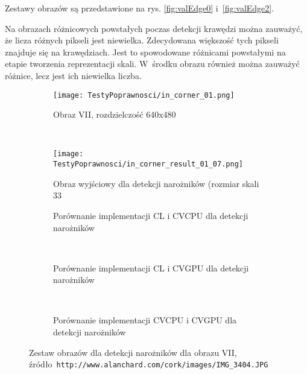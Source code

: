 Zestawy obrazów są przedstawione na rys. \ref{fig:valEdge0} i~\ref{fig:valEdge2}. 

Na obrazach różnicowych powstałych poczas detekcji krawędzi można zauważyć, że licza różnych pikseli jest niewielka. Zdecydowana większość tych pikseli znajduje się na krawędziach. Jest to spowodowane różnicami powstałymi na etapie tworzenia reprezentacji skali. W~środku obrazu również można zauważyć różnice, lecz jest ich niewielka liczba.

\begin{figure}[h]

\begin{center}
\begin{subfigure}[t]{0.3\textwidth}
\texttt{[image: TestyPoprawnosci/in\_corner\_01.png]}
\caption{Obraz VII, rozdzielczość 640x480}
\label{fig:valCorner01}
\end{subfigure}
~
\begin{subfigure}[t]{0.3\textwidth}
\texttt{[image: TestyPoprawnosci/in\_corner\_result\_01\_07.png]}
\caption{Obraz wyjściowy dla detekcji narożników (rozmiar skali 33}
\label{fig:valCornerResult01}
\end{subfigure}
\end{center}

\begin{subfigure}[t]{0.3\textwidth}
	\centering
	\setlength\fboxsep{0pt}
	\setlength\fboxrule{0.5pt}
	\caption{Porównanie implementacji CL i CVCPU dla detekcji narożników}
	\label{fig:valCorner1CLCVCPU}
\end{subfigure}
~
\begin{subfigure}[t]{0.3\textwidth}
	\centering
	\setlength\fboxsep{0pt}
	\setlength\fboxrule{0.5pt}
	\caption{Porównanie implementacji CL i CVGPU dla detekcji narożników}
	\label{fig:valCorner1CLCVGPU}
\end{subfigure}
~
\begin{subfigure}[t]{0.3\textwidth}
	\centering
	\setlength\fboxsep{0pt}
	\setlength\fboxrule{0.5pt}
	\caption{Porównanie implementacji CVCPU i CVGPU dla detekcji narożników}
	\label{fig:valCorner1CVCPUCVGPU}                 
\end{subfigure}
\caption{Zestaw obrazów dla detekcji narożników dla obrazu VII, \tiny{źródło~\texttt{http://www.alanchard.com/cork/images/IMG\_3404.JPG}}}

\label{fig:valCorner1}
\end{figure}

